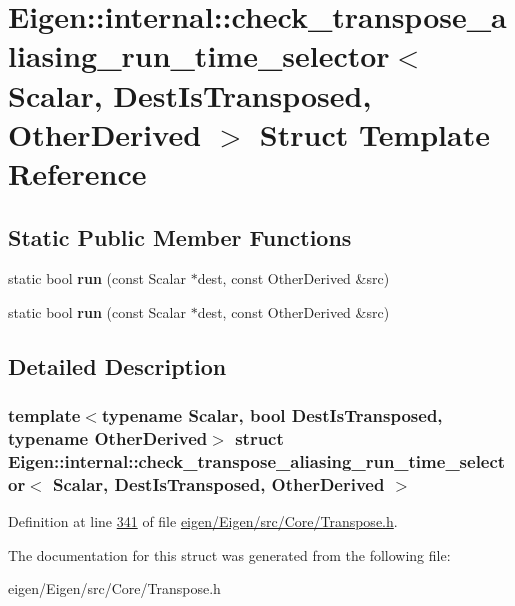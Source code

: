 \hypertarget{struct_eigen_1_1internal_1_1check__transpose__aliasing__run__time__selector}{}\section{Eigen\+:\+:internal\+:\+:check\+\_\+transpose\+\_\+aliasing\+\_\+run\+\_\+time\+\_\+selector$<$ Scalar, Dest\+Is\+Transposed, Other\+Derived $>$ Struct Template Reference}
\label{struct_eigen_1_1internal_1_1check__transpose__aliasing__run__time__selector}
\subsection*{Static Public Member Functions}
\begin{DoxyCompactItemize}
\item 
\mbox{\label{struct_eigen_1_1internal_1_1check__transpose__aliasing__run__time__selector_afe5ddaa724ea7106086bc07105d3a55f}} 
static bool {\bfseries run} (const Scalar $\ast$dest, const Other\+Derived \&src)
\item 
\mbox{\label{struct_eigen_1_1internal_1_1check__transpose__aliasing__run__time__selector_afe5ddaa724ea7106086bc07105d3a55f}} 
static bool {\bfseries run} (const Scalar $\ast$dest, const Other\+Derived \&src)
\end{DoxyCompactItemize}


\subsection{Detailed Description}
\subsubsection*{template$<$typename Scalar, bool Dest\+Is\+Transposed, typename Other\+Derived$>$\newline
struct Eigen\+::internal\+::check\+\_\+transpose\+\_\+aliasing\+\_\+run\+\_\+time\+\_\+selector$<$ Scalar, Dest\+Is\+Transposed, Other\+Derived $>$}



Definition at line \hyperlink{eigen_2_eigen_2src_2_core_2_transpose_8h_source_l00341}{341} of file \hyperlink{eigen_2_eigen_2src_2_core_2_transpose_8h_source}{eigen/\+Eigen/src/\+Core/\+Transpose.\+h}.



The documentation for this struct was generated from the following file\+:\begin{DoxyCompactItemize}
\item 
eigen/\+Eigen/src/\+Core/\+Transpose.\+h\end{DoxyCompactItemize}
